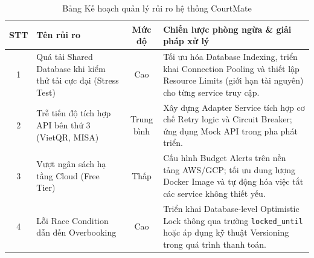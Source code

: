 \begin{table}[H]
    \centering
    \renewcommand{\arraystretch}{1.4}
    \begin{tabularx}{\textwidth}{|c|p{4cm}|c|X|}
    \hline
    \textbf{STT} & \textbf{Tên rủi ro} & \textbf{Mức độ} & \textbf{Chiến lược phòng ngừa \& giải pháp xử lý} \\ \hline
    1 & Quá tải Shared Database khi kiểm thử tải cực đại (Stress Test) & Cao & Tối ưu hóa Database Indexing, triển khai Connection Pooling và thiết lập Resource Limits (giới hạn tài nguyên) cho từng service truy cập. \\ \hline
    2 & Trễ tiến độ tích hợp API bên thứ 3 (VietQR, MISA) & Trung bình & Xây dựng Adapter Service tích hợp cơ chế Retry logic và Circuit Breaker; ứng dụng Mock API trong pha phát triển. \\ \hline
    3 & Vượt ngân sách hạ tầng Cloud (Free Tier) & Thấp & Cấu hình Budget Alerts trên nền tảng AWS/GCP; tối ưu dung lượng Docker Image và tự động hóa việc tắt các service không thiết yếu. \\ \hline
    4 & Lỗi Race Condition dẫn đến Overbooking & Cao & Triển khai Database-level Optimistic Lock thông qua trường \texttt{locked\_until} hoặc áp dụng kỹ thuật Versioning trong quá trình thanh toán. \\ \hline
    \end{tabularx}
    \caption{Bảng Kế hoạch quản lý rủi ro hệ thống CourtMate}
    \label{tab:risk_management}
\end{table}